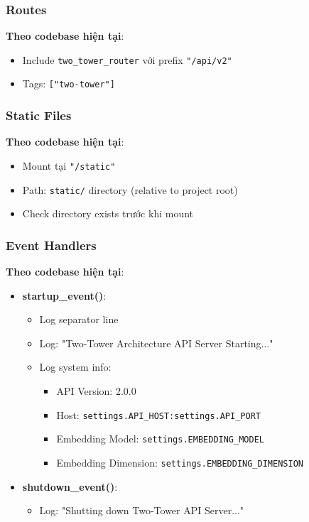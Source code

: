 \subsubsection{Routes}

\textbf{Theo codebase hiện tại}:

\begin{itemize}
    \item Include \texttt{two\_tower\_router} với prefix \texttt{"/api/v2"}
    \item Tags: \texttt{["two-tower"]}
\end{itemize}

\subsubsection{Static Files}

\textbf{Theo codebase hiện tại}:

\begin{itemize}
    \item Mount tại \texttt{"/static"}
    \item Path: \texttt{static/} directory (relative to project root)
    \item Check directory exists trước khi mount
\end{itemize}

\subsubsection{Event Handlers}

\textbf{Theo codebase hiện tại}:

\begin{itemize}
    \item \textbf{startup\_event()}:
    \begin{itemize}
        \item Log separator line
        \item Log: "Two-Tower Architecture API Server Starting..."
        \item Log system info:
        \begin{itemize}
            \item API Version: 2.0.0
            \item Host: \texttt{settings.API\_HOST:settings.API\_PORT}
            \item Embedding Model: \texttt{settings.EMBEDDING\_MODEL}
            \item Embedding Dimension: \texttt{settings.EMBEDDING\_DIMENSION}
        \end{itemize}
    \end{itemize}
    
    \item \textbf{shutdown\_event()}:
    \begin{itemize}
        \item Log: "Shutting down Two-Tower API Server..."
    \end{itemize}
\end{itemize}

